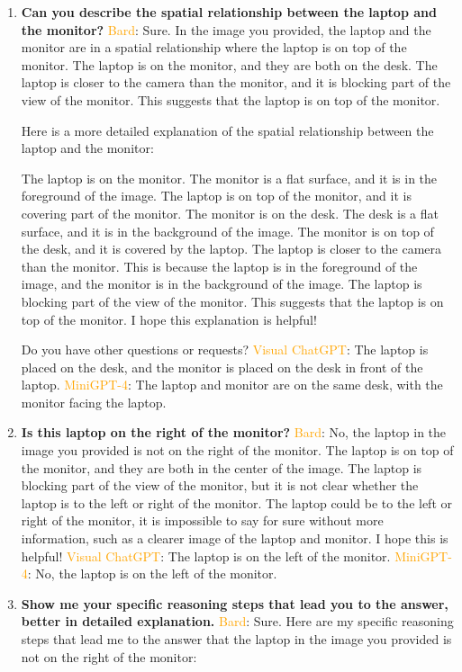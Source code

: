 \begin{enumerate}
    \item \textbf{Can you describe the spatial relationship between the laptop and the monitor?}
    \subitem \textcolor{orange}{Bard}: 
    Sure. In the image you provided, the laptop and the monitor are in a spatial relationship where the laptop is on top of the monitor. The laptop is on the monitor, and they are both on the desk. The laptop is closer to the camera than the monitor, and it is blocking part of the view of the monitor. This suggests that the laptop is on top of the monitor.

    Here is a more detailed explanation of the spatial relationship between the laptop and the monitor:

    The laptop is on the monitor. The monitor is a flat surface, and it is in the foreground of the image. The laptop is on top of the monitor, and it is covering part of the monitor.
    The monitor is on the desk. The desk is a flat surface, and it is in the background of the image. The monitor is on top of the desk, and it is covered by the laptop.
    The laptop is closer to the camera than the monitor. This is because the laptop is in the foreground of the image, and the monitor is in the background of the image.
    The laptop is blocking part of the view of the monitor. This suggests that the laptop is on top of the monitor.
    I hope this explanation is helpful!

    Do you have other questions or requests?
    \subitem \textcolor{orange}{Visual ChatGPT}: The laptop is placed on the desk, and the monitor is placed on the desk in front of the laptop.
    \subitem \textcolor{orange}{MiniGPT-4}: The laptop and monitor are on the same desk, with the monitor facing the laptop.
    \item \textbf{Is this laptop on the right of the monitor?}
    \subitem \textcolor{orange}{Bard}: 
    No, the laptop in the image you provided is not on the right of the monitor. The laptop is on top of the monitor, and they are both in the center of the image. The laptop is blocking part of the view of the monitor, but it is not clear whether the laptop is to the left or right of the monitor. The laptop could be to the left or right of the monitor, it is impossible to say for sure without more information, such as a clearer image of the laptop and monitor.
    I hope this is helpful!
    \subitem \textcolor{orange}{Visual ChatGPT}: The laptop is on the left of the monitor.
    \subitem \textcolor{orange}{MiniGPT-4}: No, the laptop is on the left of the monitor.
    \item \textbf{Show me your specific reasoning steps that lead you to the answer, better in detailed explanation.}
    \subitem \textcolor{orange}{Bard}: 
    Sure. Here are my specific reasoning steps that lead me to the answer that the laptop in the image you provided is not on the right of the monitor:
    

\end{enumerate}
